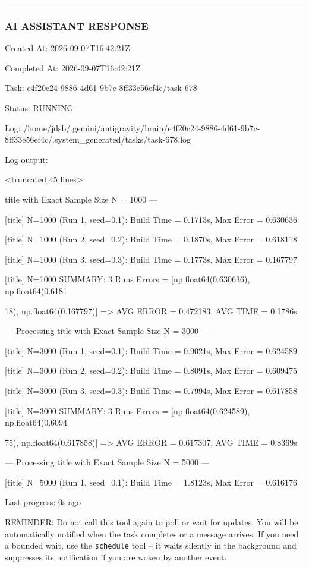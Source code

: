 \documentclass[11pt,a4paper]{article}
\begin{document}
\hrule

\subsubsection{AI ASSISTANT RESPONSE}

Created At: 2026-09-07T16:42:21Z

Completed At: 2026-09-07T16:42:21Z

Task: e4f20c24-9886-4d61-9b7c-8ff33e56ef4c/task-678

Status: RUNNING

Log: /home/jdsb/.gemini/antigravity/brain/e4f20c24-9886-4d61-9b7c-8ff33e56ef4c/.system\_generated/tasks/task-678.log

Log output:

<truncated 45 lines>

title with Exact Sample Size N = 1000 ---

[title] N=1000 (Run 1, seed=0.1): Build Time = 0.1713s, Max Error = 0.630636

[title] N=1000 (Run 2, seed=0.2): Build Time = 0.1870s, Max Error = 0.618118

[title] N=1000 (Run 3, seed=0.3): Build Time = 0.1773s, Max Error = 0.167797

[title] N=1000 SUMMARY: 3 Runs Errors = [np.float64(0.630636), np.float64(0.6181

18), np.float64(0.167797)] => AVG ERROR = 0.472183, AVG TIME = 0.1786s

--- Processing title with Exact Sample Size N = 3000 ---

[title] N=3000 (Run 1, seed=0.1): Build Time = 0.9021s, Max Error = 0.624589

[title] N=3000 (Run 2, seed=0.2): Build Time = 0.8091s, Max Error = 0.609475

[title] N=3000 (Run 3, seed=0.3): Build Time = 0.7994s, Max Error = 0.617858

[title] N=3000 SUMMARY: 3 Runs Errors = [np.float64(0.624589), np.float64(0.6094

75), np.float64(0.617858)] => AVG ERROR = 0.617307, AVG TIME = 0.8369s

--- Processing title with Exact Sample Size N = 5000 ---

[title] N=5000 (Run 1, seed=0.1): Build Time = 1.8123s, Max Error = 0.616176


Last progress: 0s ago



REMINDER: Do not call this tool again to poll or wait for updates. You will be automatically notified when the task completes or a message arrives. If you need a bounded wait, use the \texttt{schedule} tool -- it waits silently in the background and suppresses its notification if you are woken by another event.
\end{document}
